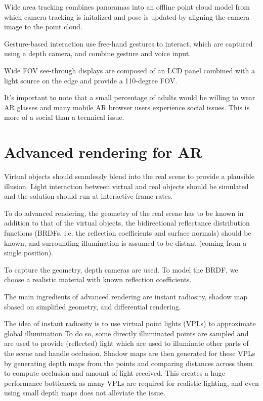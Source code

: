\documentclass[a4paper]{article}
\begin{document}
Wide area tracking combines panoramas into an offline point cloud model from which camera tracking is initalized and pose is updated by aligning the camera image to the point cloud.

Gesture-based interaction use free-hand gestures to interact, which are captured using a depth camera, and combine gesture and voice input.

Wide FOV see-through displays are composed of an LCD panel combined with a light source on the edge and provide a 110-degree FOV.

It's important to note that a small percentage of adults would be willing to wear AR glasses and many mobile AR browser users experience social issues. This is more of a social than a tecnnical issue.

\section{Advanced rendering for AR}
Virtual objects should seamlessly blend into the real scene to provide a plausible illusion. Light interaction between virtual and real objects should be simulated and the solution should run at interactive frame rates.

To do advanced rendering, the geometry of the real scene has to be known in addition to that of the virtual objects, the bidirectional reflectance distribution functions (BRDFs, i.e. the reflection coefficients and surface normals) should be known, and surrounding illumination is assumed to be distant (coming from a single position).

To capture the geometry, depth cameras are used.
To model the BRDF, we choose a realistic material with known reflection coefficients.

The main ingredients of advanced rendering are instant radiosity, shadow map sbased on simplified geometry, and differential rendering.

The idea of instant radiosity is to use virtual point lights (VPLs) to approximate global illumination
To do so, some directly illuminated points are sampled and are used to provide (reflected) light which are used to illuminate other parts of the scene and handle occlusion.
Shadow maps are then generated for these VPLs by generating depth maps from the points and comparing distances across them to compute occlusion and amount of light received.
This creates a huge performance bottleneck as many VPLs are required for realistic lighting, and even using small depth maps does not alleviate the issue.
\end{document}
